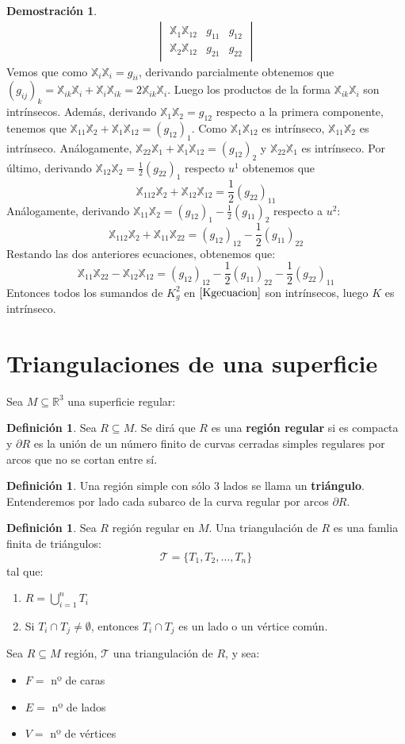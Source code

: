 \documentclass[twoside]{report}
\theoremstyle{definition}
\newtheorem{defi}[theorem]{Definición}
\newtheorem*{dem}{Demostración}
\numberwithin{equation}{section}
\newcommand{\R}{\mathbb{R}}
\newcommand{\X}{\mathbb{X}}
\begin{document}
\begin{dem}
\begin{align}
\begin{vmatrix}
	\X_1 \X_{12} & g_{11} & g_{12}\\
	\X_2 \X_{12} & g_{21} & g_{22}
\end{vmatrix}\label{Kgecuacion}
\end{align}
Vemos que como $\X_i \X_i = g_{ii}$, derivando parcialmente obtenemos que $(g_{ij})_k = \X_{ik}\X_i + \X_i\X_{ik} = 2\X_{ik}\X_i$. Luego los productos de la forma $\X_{ik}\X_i$ son intrínsecos. Además, derivando $\X_1\X_2 = g_{12}$ respecto a la primera componente, tenemos que $\X_{11}\X_2 + \X_1 \X_{12} = (g_{12})_1$. Como $\X_1\X_{12}$ es intrínseco, $\X_{11}\X_2$ es intrínseco. Análogamente, $\X_{22}\X_1 + \X_1 \X_{12} = (g_{12})_2$ y $\X_{22}\X_1$ es intrínseco. Por último, derivando $\X_{12}\X_2=\frac{1}{2}(g_{22})_1$ respecto $u^1$ obtenemos que 
\[\X_{112}\X_2 + \X_{12}\X_{12} = \frac{1}{2}(g_{22})_{11}\]
Análogamente, derivando $\X_{11} \X_2 = (g_{12})_1 - \frac{1}{2}(g_{11})_2$ respecto a $u^2$:
\[ \X_{112}\X_2 + \X_{11}\X_{22} = (g_{12})_{12} - \frac{1}{2}(g_{11})_{22}\]
Restando las dos anteriores ecuaciones, obtenemos que:
\[ \X_{11} \X_{22} - \X_{12}\X_{12} = (g_{12})_{12} - \frac{1}{2} (g_{11})_{22} - \frac{1}{2} (g_{22})_{11} \]
Entonces todos los sumandos de $K_g^2$ en $\eqref{Kgecuacion}$ son intrínsecos, luego $K$ es intrínseco.
\end{dem}

\section{Triangulaciones de una superficie}
Sea $M \subseteq \R^3$ una superficie regular:

\begin{defi}
Sea $R \subseteq M$. Se dirá que $R$ es una \textbf{región regular} si es compacta y $\partial R$ es la unión de un número finito de curvas cerradas simples regulares por arcos que no se cortan entre sí.
\end{defi}

\begin{defi}
Una región simple con sólo 3 lados se llama un \textbf{triángulo}. Entenderemos por lado cada subarco de la curva regular por arcos $\partial R$.
\end{defi}

\begin{defi}
Sea $R$ región regular en $M$. Una triangulación de $R$ es una famlia finita de triángulos:
\[ \mathcal{T} = \{ T_1, T_2, \dots, T_n \} \]
tal que:
\begin{enumerate}
	\item $R = \bigcup_{i=1}^n T_i$
	\item Si $T_i \cap T_j \neq \emptyset$, entonces $T_i \cap T_j$ es un lado o un vértice común.
\end{enumerate}
Sea $R \subseteq M$ región, $\mathcal{T}$ una triangulación de $R$, y sea:
\begin{itemize}
	\item $F =$ nº de caras
	\item $E =$ nº de lados
	\item $V =$ nº de vértices
\end{itemize}
\end{defi}
\end{document}
